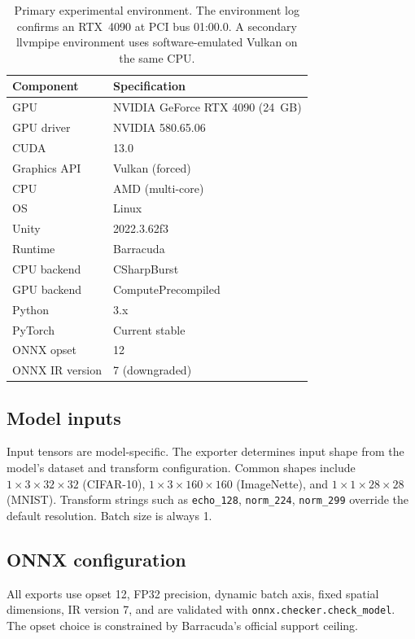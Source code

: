 \documentclass[10pt,twocolumn,letterpaper]{article}
\begin{document}
\begin{table}[t]
\centering\small
\begin{tabular}{ll}
\toprule
Component & Specification \\
\midrule
GPU & NVIDIA GeForce RTX 4090 (24~GB) \\
GPU driver & NVIDIA 580.65.06 \\
CUDA & 13.0 \\
Graphics API & Vulkan (forced) \\
CPU & AMD (multi-core) \\
OS & Linux \\
Unity & 2022.3.62f3 \\
Runtime & Barracuda \\
CPU backend & CSharpBurst \\
GPU backend & ComputePrecompiled \\
Python & 3.x \\
PyTorch & Current stable \\
ONNX opset & 12 \\
ONNX IR version & 7 (downgraded) \\
\bottomrule
\end{tabular}
\caption{Primary experimental environment. The environment log confirms an RTX~4090 at PCI bus 01:00.0. A secondary llvmpipe environment uses software-emulated Vulkan on the same CPU.}
\label{tab:environment}
\end{table}

\subsection{Model inputs}

Input tensors are model-specific. The exporter determines input shape from the model's dataset and transform configuration. Common shapes include $1\times3\times32\times32$ (CIFAR-10), $1\times3\times160\times160$ (ImageNette), and $1\times1\times28\times28$ (MNIST). Transform strings such as \texttt{echo\_128}, \texttt{norm\_224}, \texttt{norm\_299} override the default resolution. Batch size is always 1.

\subsection{ONNX configuration}

All exports use opset 12, FP32 precision, dynamic batch axis, fixed spatial dimensions, IR version 7, and are validated with \texttt{onnx.checker.check\_model}. The opset choice is constrained by Barracuda's official support ceiling.
\end{document}
